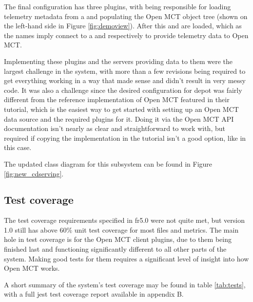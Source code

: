 The final configuration has three plugins, with  being responsible for loading telemetry metadata from a  and populating the Open MCT object tree (shown on the left-hand side in Figure \ref{fig:demoview}). After this  and  are loaded, which as the names imply connect to a  and  respectively to provide telemetry data to Open MCT.

Implementing these plugins and the servers providing data to them were the largest challenge in the system, with more than a few revisions being required to get everything working in a way that made sense and didn't result in very messy code. It was also a challenge since the desired configuration for \Gls{depot} was fairly different from the reference implementation of Open MCT featured in their tutorial, which is the easiest way to get started with setting up an Open MCT data source and the required plugins for it. Doing it via the Open MCT API documentation isn't nearly as clear and straightforward to work with, but required if copying the implementation in the tutorial isn't a good option, like in this case.

The updated class diagram for this subsystem can be found in Figure \ref{fig:new_cdserving}.

\subsection{Test coverage}
The test coverage requirements specified in \acrshort{fr}5.0 were not quite met, but version 1.0 still has above $60\%$ unit test coverage for most files and metrics. The main hole in test coverage is for the Open MCT client plugins, due to them being finished last and functioning significantly different to all other parts of the system. Making good tests for them requires a significant level of insight into how Open MCT works.

A short summary of the system's test coverage may be found in table \ref{tab:tests}, with a full \Gls{jest} test coverage report available in appendix B.

